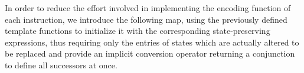 In order to reduce the effort involved in implementing the encoding function of each instruction, we introduce the following map,
using the previously defined template functions to initialize it with the corresponding state-preserving expressions,
thus requiring only the entries of states which are actually altered to be replaced
and provide an implicit  conversion operator returning a conjunction to define all successors at once.


